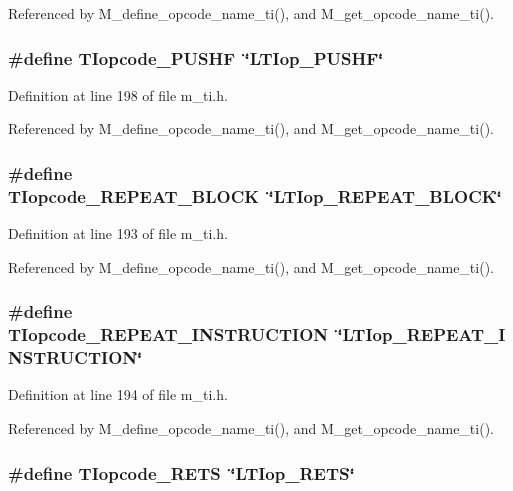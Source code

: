Referenced by M\_\-define\_\-opcode\_\-name\_\-ti(), and M\_\-get\_\-opcode\_\-name\_\-ti().
\subsubsection{\setlength{\rightskip}{0pt plus 5cm}\#define TIopcode\_\-PUSHF~\char`\"{}LTIop\_\-PUSHF\char`\"{}}\label{m__ti_8h_2d85839e1e9d049c59e2d311a4600677}




Definition at line 198 of file m\_\-ti.h.

Referenced by M\_\-define\_\-opcode\_\-name\_\-ti(), and M\_\-get\_\-opcode\_\-name\_\-ti().
\subsubsection{\setlength{\rightskip}{0pt plus 5cm}\#define TIopcode\_\-REPEAT\_\-BLOCK~\char`\"{}LTIop\_\-REPEAT\_\-BLOCK\char`\"{}}\label{m__ti_8h_5d794d6d80763b6e476e09111c9b657a}




Definition at line 193 of file m\_\-ti.h.

Referenced by M\_\-define\_\-opcode\_\-name\_\-ti(), and M\_\-get\_\-opcode\_\-name\_\-ti().
\subsubsection{\setlength{\rightskip}{0pt plus 5cm}\#define TIopcode\_\-REPEAT\_\-INSTRUCTION~\char`\"{}LTIop\_\-REPEAT\_\-INSTRUCTION\char`\"{}}\label{m__ti_8h_36ddcbdece5956d9c351307bd075fffe}




Definition at line 194 of file m\_\-ti.h.

Referenced by M\_\-define\_\-opcode\_\-name\_\-ti(), and M\_\-get\_\-opcode\_\-name\_\-ti().
\subsubsection{\setlength{\rightskip}{0pt plus 5cm}\#define TIopcode\_\-RETS~\char`\"{}LTIop\_\-RETS\char`\"{}}\label{m__ti_8h_494baa7f63fd8fb0520df70a550832b8}




